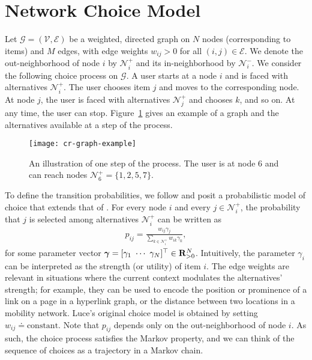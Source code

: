 \section{Network Choice Model}  %
\label{cr:sec:model}

Let $\mathcal{G} = (\mathcal{V}, \mathcal{E})$ be a weighted, directed graph on $N$ nodes (corresponding to items) and $M$ edges, with edge weights $w_{ij} > 0$ for all $(i, j) \in \mathcal{E}$.
We denote the out-neighborhood of node $i$ by $\mathcal{N}^+_i$ and its in-neighborhood by $\mathcal{N}^-_i$.
We consider the following choice process on $\mathcal{G}$.
A user starts at a node $i$ and is faced with alternatives $\mathcal{N}^+_i$.
The user chooses item $j$ and moves to the corresponding node.
At node $j$, the user is faced with alternatives $\mathcal{N}^+_j$ and chooses $k$, and so on.
At any time, the user can stop.
Figure~\ref{cr:fig:samplenet} gives an example of a graph and the alternatives available at a step of the process.

\begin{figure}
  \centering
  \texttt{[image: cr-graph-example]}
  \caption{An illustration of one step of the process.
  The user is at node 6 and can reach nodes $\mathcal{N}^+_6 = \{1, 2, 5, 7\}$.}
  \label{cr:fig:samplenet}
\end{figure}

To define the transition probabilities, we follow \citet{kumar2015inverting} and posit a probabilistic model of choice that extends that of \citet{luce1959individual}.
For every node $i$ and every $j \in \mathcal{N}^+_i$, the probability that $j$ is selected among alternatives $\mathcal{N}^+_i$ can be written as
\begin{align}
\label{cr:eq:singlelik}
p_{ij} = \frac{w_{ij} \gamma_j}{\sum_{k \in \mathcal{N}^+_i} w_{ik} \gamma_k},
\end{align}
for some parameter vector $\bm{\gamma} = [\gamma_1 \ \cdots \ \gamma_N]^\Tr \in \mathbf{R}_{>0}^N$.
Intuitively, the parameter $\gamma_i$ can be interpreted as the strength (or utility) of item $i$.
The edge weights are relevant in situations where the current context modulates the alternatives' strength;
for example, they can be used to encode the position or prominence of a link on a page in a hyperlink graph, or the distance between two locations in a mobility network.
Luce's original choice model is obtained by setting $w_{ij} \doteq \text{constant}$.
Note that $p_{ij}$ depends only on the out-neighborhood of node $i$.
As such, the choice process satisfies the Markov property, and we can think of the sequence of choices as a trajectory in a Markov chain.

